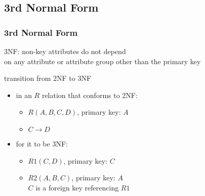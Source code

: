 \documentclass[dvipsnames]{beamer}
\begin{document}
\subsection{3rd Normal Form}

\begin{frame}
  \frametitle{3rd Normal Form}

  \begin{definition}
    \alert{3NF}: non-key attributes do not depend\\
      on any attribute or attribute group other than the primary key
  \end{definition}

  \pause
  \begin{block}{transition from 2NF to 3NF}
    \begin{itemize}
      \item in an $R$ relation that conforms to 2NF:
      \begin{itemize}
        \item $R(A,B,C,D)$, primary key: $A$
        \item $C \rightarrow D$
      \end{itemize}

      \pause
      \item for it to be 3NF:
      \begin{itemize}
        \item $R1(C,D)$, primary key: $C$
        \item $R2(A,B,C)$, primary key: $A$\\
          $C$ is a foreign key referencing $R1$
      \end{itemize}
    \end{itemize}
 \end{block}
\end{frame}
\end{document}
